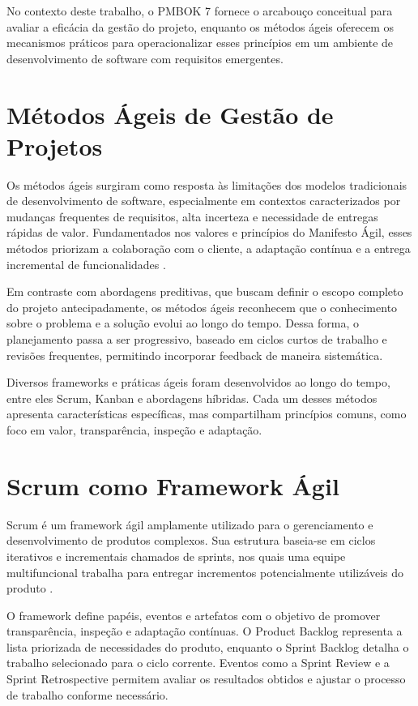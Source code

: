 No contexto deste trabalho, o PMBOK 7 fornece o arcabouço conceitual para avaliar a eficácia da gestão do projeto, enquanto os métodos ágeis oferecem os mecanismos práticos para operacionalizar esses princípios em um ambiente de desenvolvimento de software com requisitos emergentes.

\section{Métodos Ágeis de Gestão de Projetos}

Os métodos ágeis surgiram como resposta às limitações dos modelos tradicionais de desenvolvimento de software, especialmente em contextos caracterizados por mudanças frequentes de requisitos, alta incerteza e necessidade de entregas rápidas de valor. Fundamentados nos valores e princípios do Manifesto Ágil, esses métodos priorizam a colaboração com o cliente, a adaptação contínua e a entrega incremental de funcionalidades \cite{AgileManifesto}.

Em contraste com abordagens preditivas, que buscam definir o escopo completo do projeto antecipadamente, os métodos ágeis reconhecem que o conhecimento sobre o problema e a solução evolui ao longo do tempo. Dessa forma, o planejamento passa a ser progressivo, baseado em ciclos curtos de trabalho e revisões frequentes, permitindo incorporar feedback de maneira sistemática.

Diversos frameworks e práticas ágeis foram desenvolvidos ao longo do tempo, entre eles Scrum, Kanban e abordagens híbridas. Cada um desses métodos apresenta características específicas, mas compartilham princípios comuns, como foco em valor, transparência, inspeção e adaptação.

\section{Scrum como Framework Ágil}

Scrum é um framework ágil amplamente utilizado para o gerenciamento e desenvolvimento de produtos complexos. Sua estrutura baseia-se em ciclos iterativos e incrementais chamados de sprints, nos quais uma equipe multifuncional trabalha para entregar incrementos potencialmente utilizáveis do produto \cite{ScrumGuide}.

O framework define papéis, eventos e artefatos com o objetivo de promover transparência, inspeção e adaptação contínuas. O Product Backlog representa a lista priorizada de necessidades do produto, enquanto o Sprint Backlog detalha o trabalho selecionado para o ciclo corrente. Eventos como a Sprint Review e a Sprint Retrospective permitem avaliar os resultados obtidos e ajustar o processo de trabalho conforme necessário.

